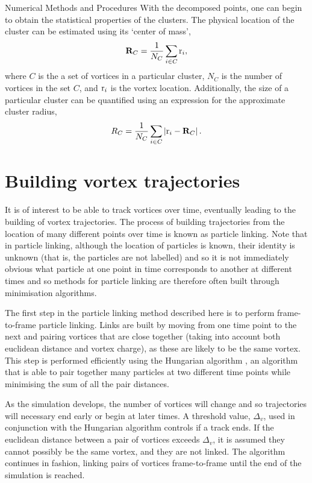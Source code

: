 \begin{chapter}{\label{cha:numerics}Numerical Methods and Procedures}
With the decomposed points, one can begin to obtain the statistical properties of the clusters. The physical location of the cluster can be estimated using its `center of mass',
\begin{equation}\label{eq:rcacom}
  \mathbf{R}_C = \frac{1}{N_C}\sum\limits_{i\in C}{\rm r}_i,
\end{equation}
where $C$ is the a set of vortices in a particular cluster, $N_C$ is the number of vortices in the set $C$, and ${\rm r}_i$ is the vortex location. Additionally, the size of a particular cluster can be quantified using an expression for the approximate cluster radius,
\begin{equation}\label{eq:rcacom}
  R_C = \frac{1}{N_C}\sum\limits_{i\in C} \left |{\rm r}_i - {\bf R}_C \right |.
\end{equation}

\section{\label{section:vortextracking} Building vortex trajectories}
It is of interest to be able to track vortices over time, eventually leading to the building of vortex trajectories. The process of building trajectories from the location of many different points over time is known as particle linking. Note that in particle linking, although the location of particles is known, their identity is unknown (that is, the particles are not labelled) and so it is not immediately obvious what particle at one point in time corresponds to another at different times and so methods for particle linking are therefore often built through minimisation algorithms. 

The first step in the particle linking method described here is to perform frame-to-frame particle linking. Links are built by moving from one time point to the next and pairing vortices that are close together (taking into account both euclidean distance and vortex charge), as these are likely to be the same vortex. This step is performed efficiently using the Hungarian algorithm \cite{hung}, an algorithm that is able to pair together many particles at two different time points while minimising the sum of all the pair distances.

As the simulation develops, the number of vortices will change and so trajectories will necessary end early or begin at later times. A threshold value, $\Delta_v$, used in conjunction with the Hungarian algorithm controls if a track ends. If the euclidean distance between a pair of vortices exceeds $\Delta_v$, it is assumed they cannot possibly be the same vortex, and they are not linked. The algorithm continues in fashion, linking pairs of vortices frame-to-frame until the end of the simulation is reached.


\end{chapter}
